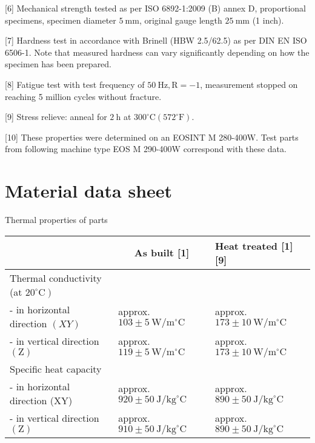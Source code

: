 \documentclass[10pt]{article}
\begin{document}
[6] Mechanical strength tested as per ISO 6892-1:2009 (B) annex D, proportional specimens, specimen diameter $5 \mathrm{~mm}$, original gauge length $25 \mathrm{~mm}$ (1 inch).

[7] Hardness test in accordance with Brinell (HBW 2.5/62.5) as per DIN EN ISO 6506-1. Note that measured hardness can vary significantly depending on how the specimen has been prepared.

[8] Fatigue test with test frequency of $50 \mathrm{~Hz}, \mathrm{R}=-1$, measurement stopped on reaching 5 million cycles without fracture.

[9] Stress relieve: anneal for $2 \mathrm{~h}$ at $300^{\circ} \mathrm{C}\left(572^{\circ} \mathrm{F}\right)$.

[10] These properties were determined on an EOSINT M 280-400W. Test parts from following machine type EOS M 290-400W correspond with these data.

\section*{Material data sheet}
Thermal properties of parts

\begin{center}
\begin{tabular}{lll}
\hline
 & \multicolumn{1}{c}{As built [1]} & Heat treated [1] [9] \\
\hline
Thermal conductivity (at $\left.20^{\circ} \mathrm{C}\right)$ &  &  \\
- in horizontal direction $(X Y)$ & approx. $103 \pm 5 \mathrm{~W} / \mathrm{m}^{\circ} \mathrm{C}$ & approx. $173 \pm 10 \mathrm{~W} / \mathrm{m}^{\circ} \mathrm{C}$ \\
\cline { 2 - 3 }
- in vertical direction $(\mathrm{Z})$ & approx. $119 \pm 5 \mathrm{~W} / \mathrm{m}^{\circ} \mathrm{C}$ & approx. $173 \pm 10 \mathrm{~W} / \mathrm{m}^{\circ} \mathrm{C}$ \\
\hline
Specific heat capacity &  &  \\
- in horizontal direction (XY) & approx. $920 \pm 50 \mathrm{~J} / \mathrm{kg}^{\circ} \mathrm{C}$ & approx. $890 \pm 50 \mathrm{~J} / \mathrm{kg}^{\circ} \mathrm{C}$ \\
- in vertical direction $(\mathrm{Z})$ & approx. $910 \pm 50 \mathrm{~J} / \mathrm{kg}^{\circ} \mathrm{C}$ & approx. $890 \pm 50 \mathrm{~J} / \mathrm{kg}^{\circ} \mathrm{C}$ \\
\hline
\end{tabular}
\end{center}
\end{document}
